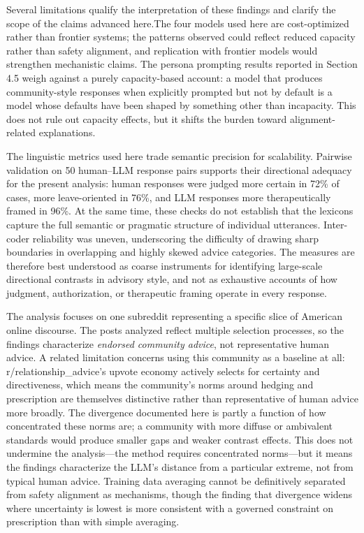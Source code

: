 Several limitations qualify the interpretation of these findings and clarify the scope of the claims advanced here.The four models used here are cost-optimized rather than frontier systems; the patterns observed could reflect reduced capacity rather than safety alignment, and replication with frontier models would 
strengthen mechanistic claims. The persona prompting results reported in Section 4.5 weigh against a purely capacity-based account: a model that produces community-style responses when explicitly prompted but not by default is a model whose defaults have been shaped by something other than incapacity. This does not rule out capacity effects, but it shifts the burden toward alignment-related explanations.

The linguistic metrics used here trade semantic precision for scalability. Pairwise validation on 50 human–LLM response pairs supports their directional adequacy for the present analysis: human responses were judged more certain in 72\% of cases, more leave-oriented in 76\%, and LLM responses more therapeutically framed in 96\%. At the same time, these checks do not establish that the lexicons capture the full semantic or pragmatic structure of individual utterances. Inter-coder reliability was uneven, underscoring the difficulty of drawing sharp boundaries in overlapping and highly skewed advice categories. The measures are therefore best understood as coarse instruments for identifying large-scale directional contrasts in advisory style, and not as exhaustive accounts of how judgment, authorization, or therapeutic framing operate in every response.

The analysis focuses on one subreddit representing a specific slice of American online discourse. The posts analyzed reflect multiple selection processes, so the findings characterize \textit{endorsed community advice}, not representative human advice. A related limitation concerns using this community as a baseline at all: r/relationship\_advice's upvote economy actively selects for certainty and directiveness, which means the community's norms around hedging and prescription are themselves distinctive rather than representative of human advice more broadly. The divergence documented here is partly a function of how concentrated these norms are; a community with more diffuse or ambivalent standards would produce smaller gaps and weaker contrast effects. This does not undermine the analysis---the method requires concentrated norms---but it means the findings characterize the LLM's distance from a particular extreme, not from typical human advice. Training data averaging cannot be definitively separated from safety alignment as mechanisms, though the finding that divergence widens where uncertainty is lowest is more consistent with a governed constraint on prescription than with simple averaging.